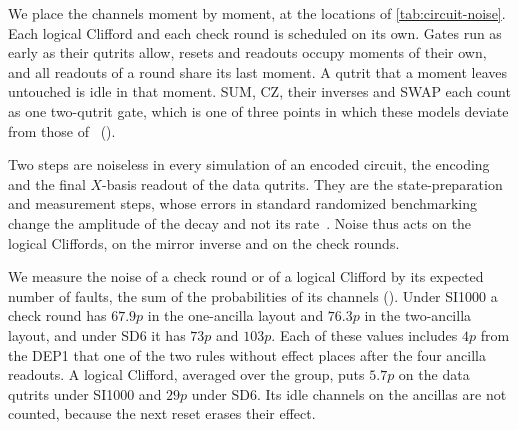 We place the channels moment by moment, at the locations of \autoref{tab:circuit-noise}. Each logical Clifford and each check round is scheduled on its own. Gates run as early as their qutrits allow, resets and readouts occupy moments of their own, and all readouts of a round share its last moment. A qutrit that a moment leaves untouched is idle in that moment. SUM, CZ, their inverses and SWAP each count as one two-qutrit gate, which is one of three points in which these models deviate from those of~\cite{GidneyHoneycomb2021} ().

Two steps are noiseless in every simulation of an encoded circuit, the encoding and the final $X$-basis readout of the data qutrits. They are the state-preparation and measurement steps, whose errors in standard randomized benchmarking change the amplitude of the decay and not its rate~\cite{Magesan2011PRL,Magesan2012PRA}. Noise thus acts on the logical Cliffords, on the mirror inverse and on the check rounds.

We measure the noise of a check round or of a logical Clifford by its expected number of faults, the sum of the probabilities of its channels (). Under SI1000 a check round has $67.9p$ in the one-ancilla layout and $76.3p$ in the two-ancilla layout, and under SD6 it has $73p$ and $103p$. Each of these values includes $4p$ from the DEP1 that one of the two rules without effect places after the four ancilla readouts. A logical Clifford, averaged over the group, puts $5.7p$ on the data qutrits under SI1000 and $29p$ under SD6. Its idle channels on the ancillas are not counted, because the next reset erases their effect.
